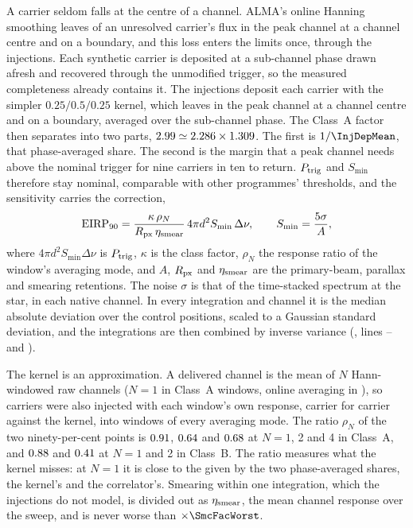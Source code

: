 A carrier seldom falls at the centre of a channel. ALMA's online Hanning
smoothing \citep{ALMAHandbook} leaves \HanBest{} of an unresolved carrier's
flux in the peak channel at a channel centre and \HanWorst{} on a boundary,
and this loss enters the limits once, through the injections. Each synthetic
carrier is deposited at a sub-channel phase drawn afresh and recovered
through the unmodified trigger, so the measured completeness already
contains it. The injections deposit each carrier with the simpler
$0.25/0.5/0.25$ kernel, which leaves \InjDepCentre{} in the peak channel at a
channel centre and \InjDepEdge{} on a boundary, \InjDepMean{} averaged over
the sub-channel phase. The Class~A factor then separates into two parts,
$2.99\simeq2.286\times1.309$. The first is
$1/\InjDepMean$, that phase-averaged share. The second is the margin
that a peak channel needs above the nominal trigger for nine carriers in ten
to return. $P_{\rm trig}$ and $S_{\min}$ therefore stay nominal, comparable
with other programmes' thresholds, and the sensitivity carries the
correction,
\begin{equation}
\mathrm{EIRP}_{90}=\frac{\kappa\,\rho_N}{R_{\rm px}\,\eta_{\rm smear}}\,
4\pi d^{2}S_{\min}\,\Delta\nu,\qquad S_{\min}=\frac{5\sigma}{A},
\label{eq:eirp90}
\end{equation}
where $4\pi d^{2}S_{\min}\Delta\nu$ is $P_{\rm trig}$, $\kappa$ is the class
factor, $\rho_N$ the response ratio of the window's averaging mode, and $A$, $R_{\rm px}$ and $\eta_{\rm smear}$ are the
primary-beam, parallax and smearing retentions. The noise $\sigma$ is that of the
time-stacked spectrum at the star, in each native channel. In every
integration and channel it is the median absolute deviation over the control
positions, scaled to a Gaussian standard deviation, and the integrations are
then combined by inverse variance (\texttt{\LrSigFile}, lines
\LrSigLineMad--\LrSigLineSig{} and \LrSigLineComb).

The kernel is an approximation. A delivered channel is the mean of $N$
Hann-windowed raw channels ($N=1$ in \SvNWinNOne{} Class~A windows, online
averaging in \SvNWinNAvg), so carriers were also injected with each window's
own response, carrier for carrier against the kernel, into \IjNWin{} windows
of every averaging mode. The ratio $\rho_N$ of the two ninety-per-cent points
is $0.91$, $0.64$ and $0.68$ at $N=1$, 2 and 4 in
Class~A, and $0.88$ and $0.41$ at $N=1$ and 2 in Class~B. The ratio measures what the kernel misses: at $N=1$ it is close
to the \NtKerToExact{} given by the two phase-averaged shares, the kernel's and the
correlator's.
Smearing within one integration, which the injections do not model, is
divided out as $\eta_{\rm smear}$, the mean channel response over the sweep,
and is never worse than $\times\SmcFacWorst$.

